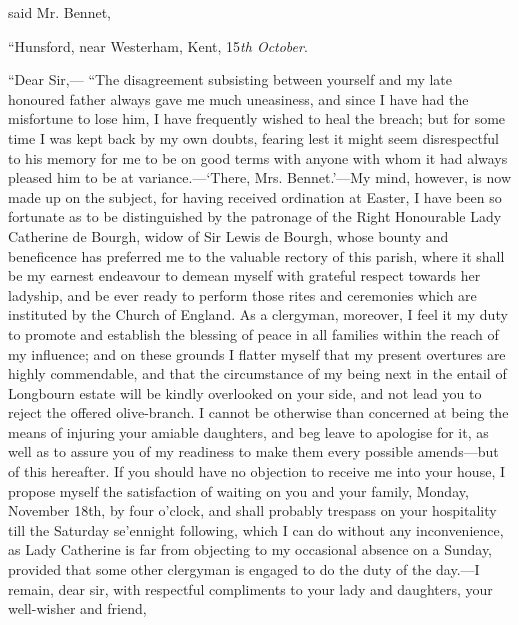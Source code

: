  said Mr. Bennet, 



“Hunsford, near Westerham, Kent, 15{\em th October}.

“Dear Sir,---\crlf
“The disagreement subsisting between yourself and my late honoured father always gave me much uneasiness, and since I have had the misfortune to lose him, I have frequently wished to heal the breach; but for some time I was kept back by my own doubts, fearing lest it might seem disrespectful to his memory for me to be on good terms with anyone with whom it had always pleased him to be at variance.---‘There, Mrs. Bennet.'---My mind, however, is now made up on the subject, for having received ordination at Easter, I have been so fortunate as to be distinguished by the patronage of the Right Honourable Lady Catherine de Bourgh, widow of Sir Lewis de Bourgh, whose bounty and beneficence has preferred me to the valuable rectory of this parish, where it shall be my earnest endeavour to demean myself with grateful respect towards her ladyship, and be ever ready to perform those rites and ceremonies which are instituted by the Church of England. As a clergyman, moreover, I feel it my duty to promote and establish the blessing of peace in all families within the reach of my influence; and on these grounds I flatter myself that my present overtures are highly commendable, and that the circumstance of my being next in the entail of Longbourn estate will be kindly overlooked on your side, and not lead you to reject the offered olive-branch. I cannot be otherwise than concerned at being the means of injuring your amiable daughters, and beg leave to apologise for it, as well as to assure you of my readiness to make them every possible amends---but of this hereafter. If you should have no objection to receive me into your house, I propose myself the satisfaction of waiting on you and your family, Monday, November 18th, by four o'clock, and shall probably trespass on your hospitality till the Saturday se'ennight following, which I can do without any inconvenience, as Lady Catherine is far from objecting to my occasional absence on a Sunday, provided that some other clergyman is engaged to do the duty of the day.---I remain, dear sir, with respectful compliments to your lady and daughters, your well-wisher and friend,

